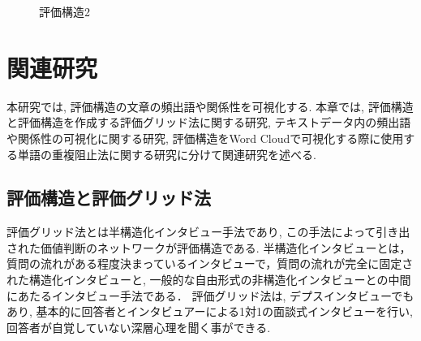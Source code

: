 \documentclass[syuuron]{kuee}
\begin{document}
		\begin{figure}
			\begin{center}
			\end{center}
			\caption{評価構造2}
	  		\label{fig:es3}
		\end{figure}

\chapter{関連研究}
	本研究では, 評価構造の文章の頻出語や関係性を可視化する. 本章では, 評価構造と評価構造を作成する評価グリッド法に関する研究, 
	テキストデータ内の頻出語や関係性の可視化に関する研究, 評価構造をWord Cloudで可視化する際に使用する単語の重複阻止法に関する研究に分けて関連研究を述べる. 
	\section{評価構造と評価グリッド法}
		評価グリッド法とは半構造化インタビュー手法であり, この手法によって引き出された価値判断のネットワークが評価構造である\cite{egm6, egm7}. 
		半構造化インタビューとは，質問の流れがある程度決まっているインタビューで，質問の流れが完全に固定された構造化インタビューと, 
		一般的な自由形式の非構造化インタビューとの中間にあたるインタビュー手法である．
		評価グリッド法は, デプスインタビューでもあり, 基本的に回答者とインタビュアーによる1対1の面談式インタビューを行い, 
		回答者が自覚していない深層心理を聞く事ができる. 
		
\end{document}
